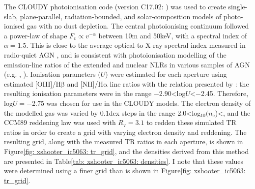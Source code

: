 The \textsc{CLOUDY} photoionisation code (version C17.02: \citealt{Ferland2017}) was used to create single-slab, plane-parallel, radiation-bounded, and solar-composition models of photo-ionised gas with no dust depletion. The central photoionising continuum followed a power-law of shape $F_v \propto v^{-\alpha}$ between 10\;{\textmu}m and 50\;keV, with a spectral index of $\alpha=1.5$. This is close to the average optical-to-X-ray spectral index measured in radio-quiet AGN \citep{Zamorani1981, Miller2011}, and is consistent with photoionisation modelling of the emission-line ratios of the extended and nuclear NLRs in various samples of AGN (e.g. \citealt{Ferland1983}, \citealt{Robinson1987}). Ionisation parameters ($U$) were estimated for each aperture using estimated [OIII]/H$\mathrm{\beta}$ and [NII]/H$\mathrm{\alpha}$ line ratios with the relation presented by \citet{Baron2019b}: the resulting ionisation parameters were in the range \mbox{$-$2.90\;\textless\;log$U$\;\textless\;$-$2.45}. Therefore, log$U=-$2.75 was chosen for use in the \textsc{CLOUDY} models. The electron density of the modelled gas was varied by 0.1\;dex steps in the range \mbox{2.0\;\textless\;log$_{10}(n_\mathrm{e}$\;[cm$^{-3}$])\;\textless{}}, and the CCM89 reddening law was used with $R_\mathrm{v}=3.1$ to redden these simulated TR ratios in order to create a grid with varying electron density and reddening. The resulting grid, along with the measured TR ratios in each aperture, is shown in Figure\;\ref{fig: xshooter_ic5063: tr_grid}, and the densities derived from this method are presented in Table\;\ref{tab: xshooter_ic5063: densities}. I note that these values were determined using a finer grid than is shown in Figure\;\ref{fig: xshooter_ic5063: tr_grid}.

